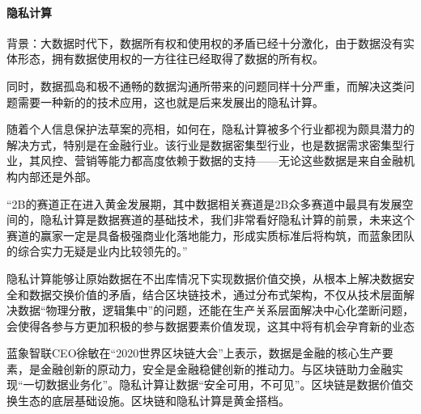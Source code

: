 \documentclass[letterpaper,10pt,english]{sphinxmanual}
\begin{document}
\paragraph{隐私计算}
\label{\detokenize{chapter_AI_company/trustbe:id2}}
背景：大数据时代下，数据所有权和使用权的矛盾已经十分激化，由于数据没有实体形态，拥有数据使用权的一方往往已经取得了数据的所有权。

同时，数据孤岛和极不通畅的数据沟通所带来的问题同样十分严重，而解决这类问题需要一种新的的技术应用，这也就是后来发展出的隐私计算。%
\begin{footnote}[1000]\sphinxAtStartFootnote
{}
%
\end{footnote}

随着个人信息保护法草案的亮相，如何在，隐私计算被多个行业都视为颇具潜力的解决方式，特别是在金融行业。该行业是数据密集型行业，也是数据需求密集型行业，其风控、营销等能力都高度依赖于数据的支持——无论这些数据是来自金融机构内部还是外部。

“2B的赛道正在进入黄金发展期，其中数据相关赛道是2B众多赛道中最具有发展空间的，隐私计算是数据赛道的基础技术，我们非常看好隐私计算的前景，未来这个赛道的赢家一定是具备极强商业化落地能力，形成实质标准后将构筑，而蓝象团队的综合实力无疑是业内比较领先的。”%
\begin{footnote}[1001]\sphinxAtStartFootnote
{}
%
\end{footnote}

隐私计算能够让原始数据在不出库情况下实现数据价值交换，从根本上解决数据安全和数据交换价值的矛盾，结合区块链技术，通过分布式架构，不仅从技术层面解决数据“物理分散，逻辑集中”的问题，还能在生产关系层面解决中心化垄断问题，会使得各参与方更加积极的参与数据要素价值发现，这其中将有机会孕育新的业态
%
\begin{footnote}[1002]\sphinxAtStartFootnote
{}
%
\end{footnote}

蓝象智联CEO徐敏在“2020世界区块链大会”上表示，数据是金融的核心生产要素，是金融创新的原动力，安全是金融稳健创新的推动力。与区块链助力金融实现“一切数据业务化”。隐私计算让数据“安全可用，不可见”。区块链是数据价值交换生态的底层基础设施。区块链和隐私计算是黄金搭档。
\end{document}
